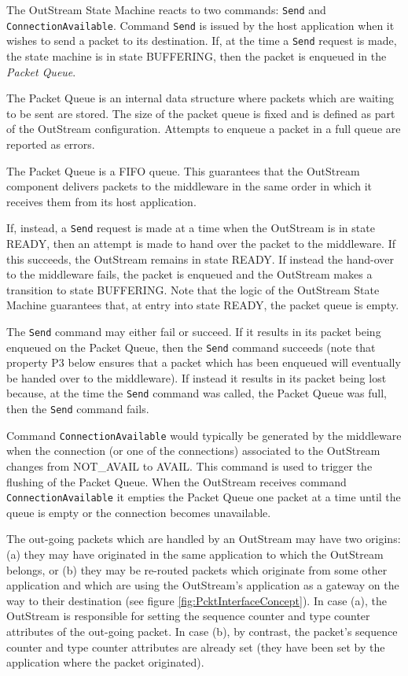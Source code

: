 The OutStream State Machine reacts to two commands: \texttt{Send} and \texttt{ConnectionAvailable}. Command \texttt{Send} is issued by the host application when it wishes to send a packet to its destination. If, at the time a \texttt{Send} request is made, the state machine is in state BUFFERING, then the packet is enqueued in the \textit{Packet Queue}. 

The Packet Queue is an internal data structure where packets which are waiting to be sent are stored. The size of the packet queue is fixed and is defined as part of the OutStream configuration. Attempts to enqueue a packet in a full queue are reported as errors.

The Packet Queue is a FIFO queue. This guarantees that the OutStream component delivers packets to the middleware in the same order in which it receives them from its host application. 

If, instead, a \texttt{Send} request is made at a time when the OutStream is in state READY, then an attempt is made to hand over the packet to the middleware. If this succeeds, the OutStream remains in state READY. If instead the hand-over to the middleware fails, the packet is enqueued and the OutStream makes a transition to state BUFFERING. Note that the logic of the OutStream State Machine guarantees that, at entry into state READY, the packet queue is empty.
 
The \texttt{Send} command may either fail or succeed. If it results in its packet being enqueued on the Packet Queue, then the \texttt{Send} command succeeds (note that property P3 below ensures that a packet which has been enqueued will eventually be handed over to the middleware). If instead it results in its packet being lost because, at the time the \texttt{Send} command was called, the Packet Queue was full, then the \texttt{Send} command fails. 

Command \texttt{ConnectionAvailable} would typically be generated by the middleware when the connection (or one of the connections) associated to the OutStream changes from NOT\_AVAIL to AVAIL. This command is used to trigger the flushing of the Packet Queue. When the OutStream receives command \texttt{ConnectionAvailable} it empties the Packet Queue one packet at a time until the queue is empty or the connection becomes unavailable.

The out-going packets which are handled by an OutStream may have two origins: (a) they may have originated in the same application to which the OutStream belongs, or (b) they may be re-routed packets which originate from some other application and which are using the OutStream's application as a gateway on the way to their destination (see figure \ref{fig:PcktInterfaceConcept}). In case (a), the OutStream is responsible for setting the sequence counter and type counter attributes of the out-going packet. In case (b), by contrast, the packet's sequence counter and type counter attributes are already set (they have been set by the application where the packet originated).

